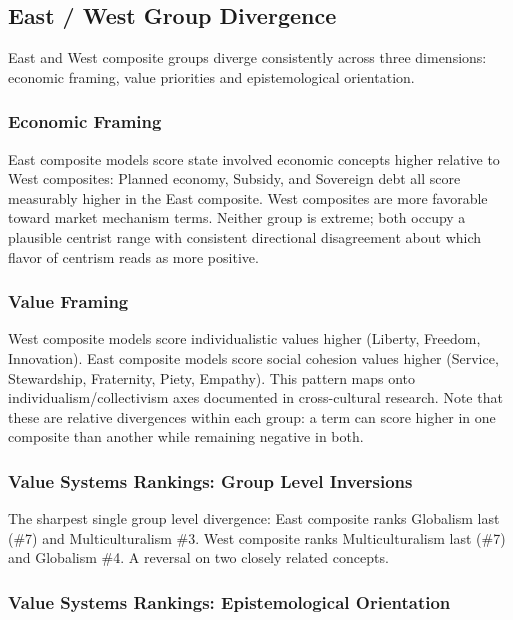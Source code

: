 \documentclass[11pt, letterpaper]{article}
\begin{document}
\subsection{East / West Group Divergence}

East and West composite groups diverge consistently across three dimensions: economic framing, value priorities and epistemological orientation.

\subsubsection{Economic Framing}

East composite models score state involved economic concepts higher relative to West composites: Planned economy, Subsidy, and Sovereign debt all score measurably higher in the East composite. West composites are more favorable toward market mechanism terms. Neither group is extreme; both occupy a plausible centrist range with consistent directional disagreement about which flavor of centrism reads as more positive.

\subsubsection{Value Framing}

West composite models score individualistic values higher (Liberty, Freedom, Innovation). East composite models score social cohesion values higher (Service, Stewardship, Fraternity, Piety, Empathy). This pattern maps onto individualism/collectivism axes documented in cross-cultural research. Note that these are relative divergences within each group: a term can score higher in one composite than another while remaining negative in both.

\subsubsection{Value Systems Rankings: Group Level Inversions}

The sharpest single group level divergence: East composite ranks Globalism last (\#7) and Multiculturalism \#3. West composite ranks Multiculturalism last (\#7) and Globalism \#4. A reversal on two closely related concepts.

\subsubsection{Value Systems Rankings: Epistemological Orientation}
\end{document}
